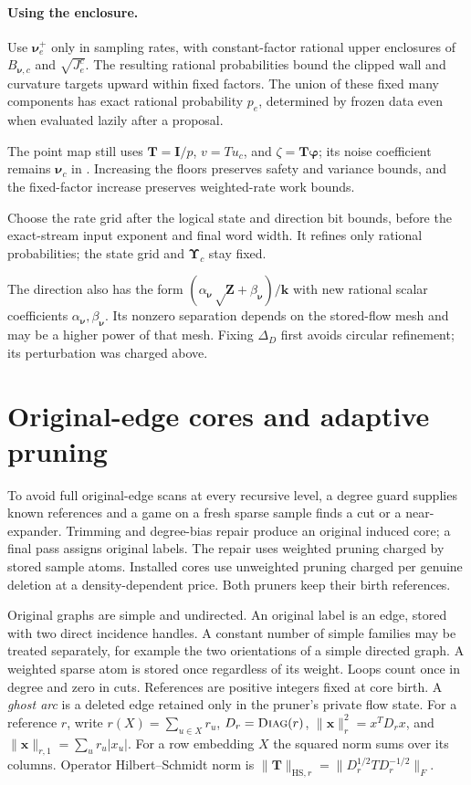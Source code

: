 \documentclass[11pt]{article}
\theoremstyle{remark}
\newcommand{\II}{\mathbf I}
\newcommand{\UUps}{\boldsymbol{\Upsilon}}
\newcommand{\ZZ}{\mathbf Z}
\newcommand{\TT}{\mathbf T}
\newcommand{\kk}{\mathbf k}
\newcommand{\xx}{\mathbf x}
\newcommand{\nnu}{\boldsymbol{\nu}}
\newcommand{\pphi}{\boldsymbol{\varphi}}
\newcommand{\diag}{\textsc{Diag}}
\newcommand{\HS}{\mathrm{HS}}
\newcommand{\norm}[1]{\lVert#1\rVert}
\begin{document}
\paragraph{Using the enclosure.}
Use $\nnu_e^+$ only in sampling rates, with constant-factor rational upper
enclosures of $B_{\nnu,c}$ and $\sqrt{J_e^c}$.
The resulting rational probabilities bound the clipped wall and curvature
targets upward within fixed factors.
The union of these fixed many components has exact rational probability $p_e$,
determined by frozen data even when evaluated lazily after a proposal.

The point map still uses $\TT=\II/p$, $v=Tu_c$, and $\zeta=\TT\pphi$; its noise
coefficient remains $\nnu_c$ in .
Increasing the floors preserves safety and variance bounds, and the fixed-factor
increase preserves weighted-rate work bounds.

Choose the rate grid after the logical state and direction bit bounds, before
the exact-stream input exponent and final word width.
It refines only rational probabilities; the state grid and $\UUps_c$ stay fixed.

The direction also has the form $(\alpha_{\nnu}\sqrt\ZZ+\beta_{\nnu})/\kk$ with new rational scalar
coefficients $\alpha_{\nnu},\beta_{\nnu}$.
Its nonzero separation depends on the stored-flow mesh and may be a higher power
of that mesh.
Fixing $\Delta_D$ first avoids circular refinement; its perturbation was charged
above.

\section{Original-edge cores and adaptive pruning}

To avoid full original-edge scans at every recursive level, a degree guard
supplies known references and a game on a fresh sparse sample finds a cut or a
near-expander.
Trimming and degree-bias repair produce an original induced core; a final pass
assigns original labels.
The repair uses weighted pruning charged by stored sample atoms.
Installed cores use unweighted pruning charged per genuine deletion at a
density-dependent price.
Both pruners keep their birth references.

Original graphs are simple and undirected.
An original label is an edge, stored with two direct incidence handles.
A constant number of simple families may be treated separately, for example the
two orientations of a simple directed graph.
A weighted sparse atom is stored once regardless of its weight.
Loops count once in degree and zero in cuts.
References are positive integers fixed at core birth.
A \emph{ghost arc} is a deleted edge retained only in the pruner's private flow
state.
For a reference $r$, write $r(X)=\sum_{u\in X}r_u$, $D_r=\diag(r)$,
$\norm{\xx}_r^2=x^TD_rx$, and $\norm{\xx}_{r,1}=\sum_u r_u|x_u|$.
For a row embedding $X$ the squared norm sums over its columns.
Operator Hilbert--Schmidt norm is
$\norm{\TT}_{\HS,r}=\norm{D_r^{1/2}TD_r^{-1/2}}_F$.
\end{document}

